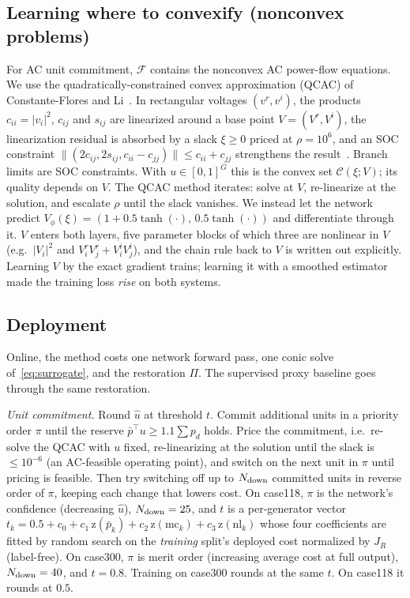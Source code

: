 \documentclass[10pt]{article}
\begin{document}
\subsection{Learning where to convexify (nonconvex problems)}
\label{sec:qcac}
For AC unit commitment, $\mathcal F$ contains the nonconvex AC power-flow equations. We use the quadratically-constrained convex approximation (QCAC) of Constante-Flores and Li~\citep{constante2025qcac}. In rectangular voltages $(v^r,v^i)$, the products $c_{ii}=|v_i|^2$, $c_{ij}$ and $s_{ij}$ are linearized around a base point $V=(V^r,V^i)$, the linearization residual is absorbed by a slack $\xi\ge0$ priced at $\rho=10^6$, and an SOC constraint $\|(2c_{ij},2s_{ij},c_{ii}-c_{jj})\|\le c_{ii}+c_{jj}$ strengthens the result~\citep{jabr2006soc}. Branch limits are SOC constraints. With $u\in[0,1]^{G}$ this is the convex set $\mathcal C(\xi;V)$; its quality depends on $V$. The QCAC method iterates: solve at $V$, re-linearize at the solution, and escalate $\rho$ until the slack vanishes. We instead let the network predict $V_\phi(\xi)=(1+0.5\tanh(\cdot),\,0.5\tanh(\cdot))$ and differentiate through it. $V$ enters both layers, five parameter blocks of which three are nonlinear in $V$ (e.g.\ $|V_i|^2$ and $V^r_iV^r_j+V^i_iV^i_j$), and the chain rule back to $V$ is written out explicitly. Learning $V$ by the exact gradient trains; learning it with a smoothed estimator made the training loss \emph{rise} on both systems.

\subsection{Deployment}
\label{sec:deployment}
Online, the method costs one network forward pass, one conic solve of~\eqref{eq:surrogate}, and the restoration $\Pi$. The supervised proxy baseline goes through the same restoration.

\emph{Unit commitment.} Round $\hat u$ at threshold $t$. Commit additional units in a priority order $\pi$ until the reserve $\bar p^\top u\ge1.1\sum p_d$ holds. Price the commitment, i.e.\ re-solve the QCAC with $u$ fixed, re-linearizing at the solution until the slack is $\le10^{-6}$ (an AC-feasible operating point), and switch on the next unit in $\pi$ until pricing is feasible. Then try switching off up to $N_{\rm down}$ committed units in reverse order of $\pi$, keeping each change that lowers cost. On case118, $\pi$ is the network's confidence (decreasing $\hat u$), $N_{\rm down}=25$, and $t$ is a per-generator vector $t_k=0.5+c_0+c_1\,\mathrm z(\bar p_k)+c_2\,\mathrm z(\text{mc}_k)+c_3\,\mathrm z(\text{nl}_k)$ whose four coefficients are fitted by random search on the \emph{training} split's deployed cost normalized by $J_R$ (label-free). On case300, $\pi$ is merit order (increasing average cost at full output), $N_{\rm down}=40$, and $t=0.8$. Training on case300 rounds at the same $t$. On case118 it rounds at $0.5$.
\end{document}
